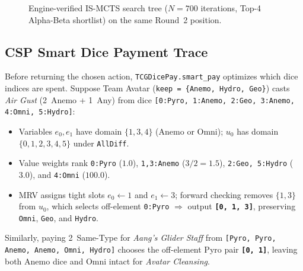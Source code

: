 \documentclass[11pt,a4paper]{article}
\begin{document}
\begin{figure}[H]
{}
\caption{Engine-verified IS-MCTS search tree ($N=700$ iterations, Top-4 Alpha-Beta shortlist) on the same Round~2 position.}
\label{fig:mcts-tree}
\end{figure}

\subsection{CSP Smart Dice Payment Trace}

Before returning the chosen action, \texttt{TCGDicePay.smart\_pay} optimizes which dice indices are spent. Suppose Team Avatar (\texttt{keep = \{Anemo, Hydro, Geo\}}) casts \emph{Air Gust} (2~Anemo + 1~Any) from dice \texttt{[0:Pyro, 1:Anemo, 2:Geo, 3:Anemo, 4:Omni, 5:Hydro]}:
\begin{itemize}[leftmargin=1.4em, itemsep=1pt]
  \item Variables $e_0, e_1$ have domain $\{1, 3, 4\}$ (Anemo or Omni); $u_0$ has domain $\{0,1,2,3,4,5\}$ under \texttt{AllDiff}.
  \item Value weights rank \texttt{0:Pyro} ($1.0$), \texttt{1,3:Anemo} ($3/2 = 1.5$), \texttt{2:Geo, 5:Hydro} ($3.0$), and \texttt{4:Omni} ($100.0$).
  \item MRV assigns tight slots $e_0 \gets 1$ and $e_1 \gets 3$; forward checking removes $\{1,3\}$ from $u_0$, which selects off-element \texttt{0:Pyro} $\Rightarrow$ output \textbf{\texttt{[0, 1, 3]}}, preserving \texttt{Omni}, \texttt{Geo}, and \texttt{Hydro}.
\end{itemize}
Similarly, paying 2~Same-Type for \emph{Aang's Glider Staff} from \texttt{[Pyro, Pyro, Anemo, Anemo, Omni, Hydro]} chooses the off-element Pyro pair \textbf{\texttt{[0, 1]}}, leaving both Anemo dice and Omni intact for \emph{Avatar Cleansing}.
\end{document}
